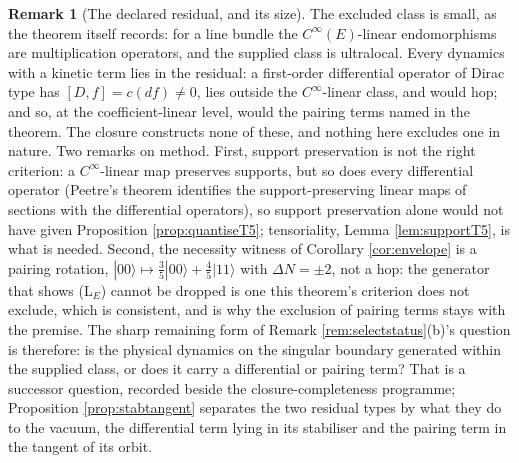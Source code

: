 \documentclass[11pt]{article}
\theoremstyle{definition}
\newtheorem{remark}[theorem]{Remark}
\begin{document}
\begin{remark}[The declared residual, and its size]\label{rem:hopresidual}
The excluded class is small, as the theorem itself records: for a line bundle the $C^\infty(E)$-linear endomorphisms are multiplication operators, and the supplied class is ultralocal. Every dynamics with a kinetic term lies in the residual: a first-order differential operator of Dirac type has $[D, f] = c(df) \neq 0$, lies outside the $C^\infty$-linear class, and would hop; and so, at the coefficient-linear level, would the pairing terms named in the theorem. The closure constructs none of these, and nothing here excludes one in nature. Two remarks on method. First, support preservation is not the right criterion: a $C^\infty$-linear map preserves supports, but so does every differential operator (Peetre's theorem identifies the support-preserving linear maps of sections with the differential operators), so support preservation alone would not have given Proposition \ref{prop:quantiseT5}; tensoriality, Lemma \ref{lem:supportT5}, is what is needed. Second, the necessity witness of Corollary \ref{cor:envelope} is a pairing rotation, $|00\rangle \mapsto \tfrac35|00\rangle + \tfrac45|11\rangle$ with $\Delta N = \pm 2$, not a hop: the generator that shows (L$_E$) cannot be dropped is one this theorem's criterion does not exclude, which is consistent, and is why the exclusion of pairing terms stays with the premise. The sharp remaining form of Remark \ref{rem:selectstatus}(b)'s question is therefore: is the physical dynamics on the singular boundary generated within the supplied class, or does it carry a differential or pairing term? That is a successor question, recorded beside the closure-completeness programme; Proposition \ref{prop:stabtangent} separates the two residual types by what they do to the vacuum, the differential term lying in its stabiliser and the pairing term in the tangent of its orbit.
\end{remark}
\end{document}
